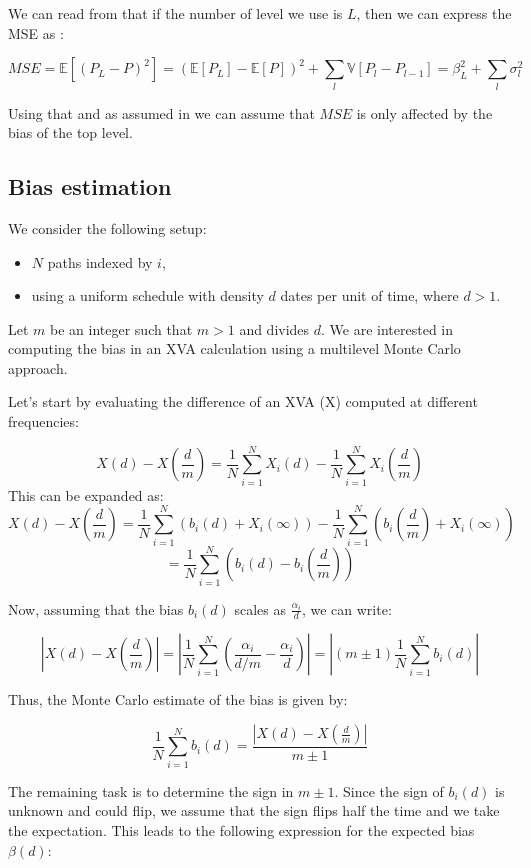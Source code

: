 \documentclass{article}
\begin{document}
We can read from \cite{internaldoc} that if the number of level we use is $L$, then we can express the MSE as :

$$MSE = \mathbb{E}[(P_L - P)^2] = (\mathbb{E}[P_L] - \mathbb{E}[P])^2 + \sum_l \mathbb{V}[P_l - P_{l-1}] = \beta ^2_L + \sum_l \sigma _l ^2 $$

Using that and as assumed in \cite{internaldoc} we can assume that $MSE$ is only affected by the bias of the top level. \\

\subsection{Bias estimation}

We consider the following setup:
\begin{itemize}
    \item $N$ paths indexed by $i$,
    \item using a uniform schedule with density $d$ dates per unit of time, where $d > 1$.
\end{itemize}

Let $m$ be an integer such that $m > 1$ and divides $d$. We are interested in computing the bias in an XVA calculation using a multilevel Monte Carlo approach. 

Let's start by evaluating the difference of an XVA (X) computed at different frequencies:

\[
X(d) - X\left(\frac{d}{m}\right) = \frac{1}{N} \sum_{i=1}^N X_i(d) - \frac{1}{N} \sum_{i=1}^N X_i\left(\frac{d}{m}\right)
\]
This can be expanded as:
\[
X(d) - X\left(\frac{d}{m}\right) = \frac{1}{N} \sum_{i=1}^N \left( b_i(d) + X_i(\infty) \right) - \frac{1}{N} \sum_{i=1}^N \left( b_i\left(\frac{d}{m}\right) + X_i(\infty) \right)
\]
\[
= \frac{1}{N} \sum_{i=1}^N \left( b_i(d) - b_i\left(\frac{d}{m}\right) \right)
\]

Now, assuming that the bias $b_i(d)$ scales as $\frac{\alpha_i}{d}$, we can write:

\[
|X(d) - X\left(\frac{d}{m}\right)| = \left|\frac{1}{N} \sum_{i=1}^N \left( \frac{\alpha_i}{d/m} - \frac{\alpha_i}{d} \right)\right|
= \left| \left(m \pm 1\right) \frac{1}{N} \sum_{i=1}^N b_i(d) \right|
\]

Thus, the Monte Carlo estimate of the bias is given by:

\[
\frac{1}{N} \sum_{i=1}^N b_i(d) = \frac{|X(d) - X\left(\frac{d}{m}\right)|}{m \pm 1}
\]

The remaining task is to determine the sign in $m \pm 1$. Since the sign of $b_i(d)$ is unknown and could flip, we assume that the sign flips half the time and we take the expectation. This leads to the following expression for the expected bias $\beta(d)$:
\end{document}
